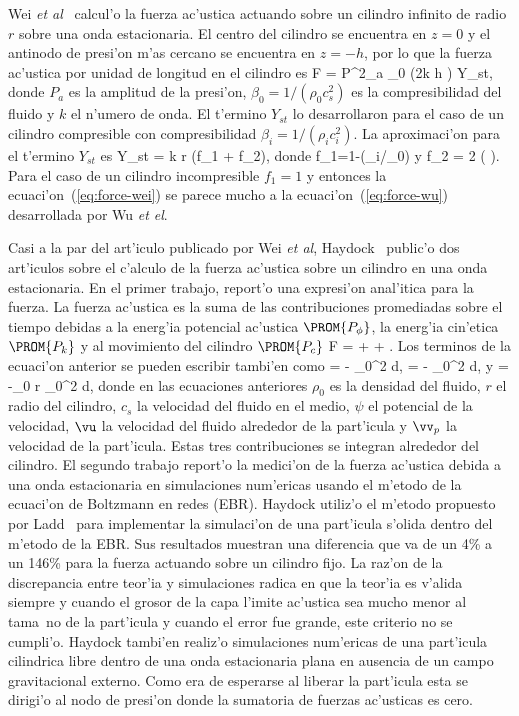 Wei {\it et al}~\cite{wei04} calcul'o la fuerza ac'ustica actuando sobre un cilindro infinito de radio $r$ sobre
una onda estacionaria.
El centro del cilindro se encuentra en $z=0$ y el antinodo de presi'on m'as cercano 
se encuentra en $z=-h$, por lo que la fuerza ac'ustica por unidad de longitud en el cilindro es
\BE\label{eq:force-wei} 
F = P^2_a \beta_0 \sin (2k h ) Y_{st},
\EE
donde $P_a$ es la amplitud de la presi'on, $\beta_0=1/(\rho_0 c_s^2)$ es la compresibilidad del fluido y $k$
el n'umero de onda. 
El t'ermino $Y_{st}$ lo desarrollaron para el caso de un cilindro compresible con compresibilidad 
$\beta_i=1/(\rho_i c_i^2)$. La aproximaci'on para el t'ermino $Y_{st}$ es
\BE
Y_{st} = \pi k r (f_1 + f_2),
\EE
donde 
\BE
f_1=1-(\beta_i/\beta_0)
\EE 
y
\BE
f_2 = 2 \left(  \right).
\EE
Para el caso de un cilindro incompresible $f_1 = 1$ y entonces la ecuaci'on~(\ref{eq:force-wei}) se parece mucho
a la ecuaci'on~(\ref{eq:force-wu}) desarrollada por Wu {\it et el}. 

Casi a la par del art'iculo publicado por Wei {\it et al}, Haydock~\cite{haydock05,haydock05b} public'o dos
art'iculos sobre el c'alculo  de la fuerza ac'ustica  sobre un cilindro en una onda estacionaria. En el primer
trabajo, report'o una expresi'on anal'itica para la fuerza. La fuerza ac'ustica es la suma de las contribuciones
promediadas sobre el tiempo debidas a la energ'ia potencial ac'ustica $\PROM{P_\phi}$,  la energ'ia cin'etica $\PROM{P_k}$ y 
al movimiento del cilindro $\PROM{P_c}$
\BE
F =   +  + .
\EE
Los terminos de la ecuaci'on anterior se pueden escribir tambi'en como
\BE
{} = - \int_0^{2\pi} \PROM{\dot{\psi}} \cos \theta d\theta,
\EE
\BE
{} = - \int_0^{2\pi}  \cos \theta d\theta,
\EE
y
\BE
{} = -\rho_0  r \int_0^{2\pi}  \cos \theta d\theta,
\EE
donde en las ecuaciones anteriores $\rho_0$ es la densidad del fluido, $r$ el radio del cilindro, $c_s$ la velocidad
del fluido en el medio, $\psi$ el potencial de la velocidad, $\vu$ la velocidad del fluido alrededor de la part'icula
y $\vv_p$ la velocidad de la part'icula. Estas tres contribuciones se integran alrededor del cilindro.
El segundo trabajo report'o la medici'on de la fuerza ac'ustica debida a una onda estacionaria en simulaciones num'ericas
usando el m'etodo de la ecuaci'on de Boltzmann en redes (EBR). Haydock utiliz'o el m'etodo propuesto por Ladd~\cite{ladd94} para
implementar la simulaci'on de una part'icula s'olida dentro del m'etodo de la EBR. Sus resultados muestran una diferencia
que va de un 4\% a un 146\% para la fuerza actuando sobre un cilindro fijo. La raz'on de la discrepancia entre teor'ia y
simulaciones radica en que la teor'ia es v'alida siempre y cuando el grosor de la capa l'imite ac'ustica sea mucho menor
al tama~no de la part'icula y cuando el error fue grande, este criterio no se cumpli'o. Haydock tambi'en realiz'o
simulaciones num'ericas de una part'icula cilindrica libre dentro de una onda estacionaria plana en ausencia de un campo
gravitacional externo. Como era de esperarse al liberar la part'icula esta se dirigi'o al nodo de presi'on donde la sumatoria
de fuerzas ac'usticas es cero.

